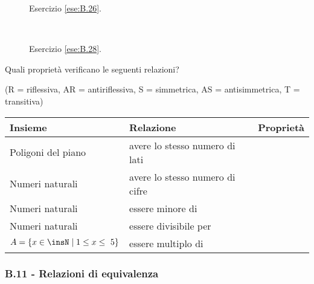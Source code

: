 \begin{figure}[t]
\begin{minipage}[b]{.45\textwidth}
 \centering
 
 \caption{Esercizio \ref{ese:B.26}.}\label{fig:B.17}
\end{minipage}\
\begin{minipage}[b]{.45\textwidth}
 \centering
 
 \caption{Esercizio \ref{ese:B.28}.}\label{fig:B.18}
\end{minipage}
\end{figure}

\begin{esercizio}
\label{ese:B.29}
Quali proprietà verificano le seguenti relazioni?
\begin{center}
(R = riflessiva, AR = antiriflessiva, S = simmetrica, AS = antisimmetrica, T = transitiva)
\end{center}
\begin{center}
\begin{tabular}{llc}
\toprule
Insieme & Relazione & Proprietà\\
\midrule
Poligoni del piano & avere lo stesso numero di lati & \boxR\quad\boxAR\quad\boxS\quad\boxAS\quad\boxT\\
Numeri naturali & avere lo stesso numero di cifre &\boxR\quad\boxAR\quad\boxS\quad\boxAS\quad\boxT\\
Numeri naturali & essere minore di &\boxR\quad\boxAR\quad\boxS\quad\boxAS\quad\boxT\\
Numeri naturali & essere divisibile per &\boxR\quad\boxAR\quad\boxS\quad\boxAS\quad\boxT\\
$A = \{ x \in \insN \mid  1 \le x \le~5 \}$ & essere multiplo di &\boxR\quad\boxAR\quad\boxS\quad\boxAS\quad\boxT\\
\bottomrule
\end{tabular}
\end{center}
\end{esercizio}

\pagebreak
\subsubsection*{B.11 - Relazioni di equivalenza}

